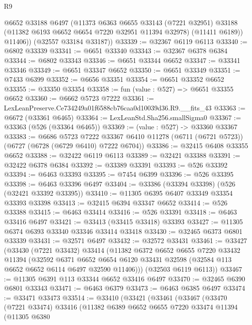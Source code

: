 \begin{lexlean}{R9}
\begin{coremodule}
          @6652
          @33188
          @6497
          (@11373
            @6363
            @6655
            @33143
            (@7221 @32951)
            @33188
            (@11382 @6193 @6652 @6654 @7220 @32951 @11394 @32978)
            (@11411 @6189))
          @11406))
      (@32557 @33184 @33187))
@33339 := @32367 @6119 @6113
@33340 := @6802 @33339
@33341 := @6651 @33340
@33343 := @32367 @6378 @6384
@33344 := @6802 @33343
@33346 := @6651 @33344 @6652
@33347 := @33341 @33346
@33349 := @6651 @33347 @6652
@33350 := @6651 @33349
@33351 := @7433 @6399
@33352 := @6656 @33351
@33354 := @6651 @33352 @6652
@33355 := @33350 @33354
@33358 := fun (value : @527) => @6651 @33355 @6652
@33360 := @6662 @5723 @7222
@33361 := LexLeanPreserve.Ce734249a01f6588cb76caa0d10039d36.R9.__fits_43
@33363 := @6672 (@33361 @6465)
@33364 := LexLeanStd.Sha256.smallSigma0
@33367 := @33363 (@526 (@33364 @6465))
@33369 := (value : @527) -> @33360 @33367
@33383 := @6686
    @5723
    @7222
    @33367
    @6410
    @11278
    (@6711 (@6721 @5723))
    (@6727 (@6728 (@6729 @6410) @7222 @6704))
@33386 := @32415 @6408 @33355 @6652
@33388 := @32422 @6119 @6113
@33389 := @32421 @33388
@33391 := @32422 @6378 @6384
@33392 := @33389 @33391
@33393 := @526 @33392
@33394 := @6463 @33393
@33395 := @7454 @6399
@33396 := @526 @33395
@33398 := @6463 @33396 @6497
@33404 := @33386 (@33394 @33398) (@526 (@32421 @33392 @33395))
@33410 := @11305 @6395 @6407 @33349 @33354 @33393 @33398
@33413 := @32415 @6394 @33347 @6652
@33414 := @526 @33388
@33415 := @6463 @33414
@33416 := @526 @33391
@33418 := @6463 @33416 @6497
@33421 := @33413 (@33415 @33418) @33393
@33427 := @11305 @6374 @6393 @33340 @33346 @33414 @33418
@33430 := @32465 @6373 @6801 @33339
@33431 := @32571 @6497
@33432 := @32572 @33431
@33461 := @33427
    (@33430
      (@7221 @33432)
      @33414
      (@11382
        @6372
        @6652
        @6655
        @7220
        @33432
        @11394
        (@32592
          @6371
          @6652
          @6654
          @6120
          @33431
          @32598
          (@32584 @113 @6652 @6652 @6114 @6497 @32590 @11406)))
      (@32503 @6119 @6113))
@33467 := @11305 @6391 @113 @33344 @6652 @33416 @6497
@33470 := @32465 @6390 @6801 @33343
@33471 := @6463 @6379
@33473 := @6463 @6385 @6497
@33474 := @33471 @33473
@33514 := @33410
    (@33421
      (@33461
        (@33467
          (@33470
            (@7221 @33474)
            @33416
            (@11382
              @6389
              @6652
              @6655
              @7220
              @33474
              @11394
              (@11305
                @6380

\end{coremodule}
\end{lexlean}
